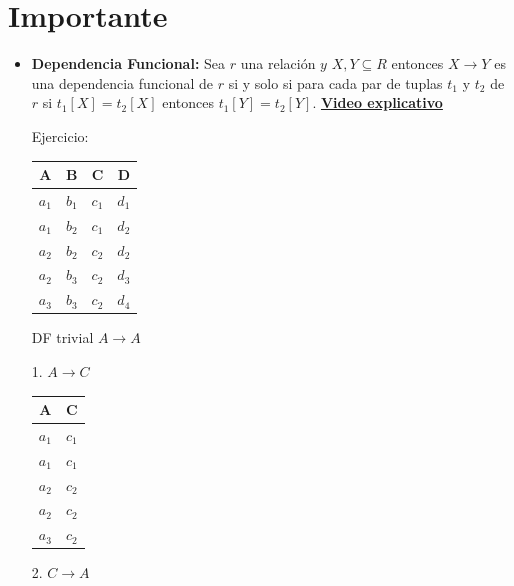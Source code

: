 \documentclass{templateNote}
\begin{document}
\portada
\margenes %

\section{Importante}

\begin{itemize}
    \item \textbf{Dependencia Funcional:} Sea $r$ una relación $y$ $X,Y \subseteq R$ entonces $X \rightarrow Y$ es una dependencia funcional de $r$ si y solo si para cada par de tuplas $t_1$ y $t_2$ de $r$ si $t_1[X] = t_2[X]$ entonces $t_1[Y] = t_2[Y]$.  
    \textbf{\href{https://www.youtube.com/watch?v=1PJLDStZVlo}{Video explicativo}}

    Ejercicio:
    \begin{center}
        \begin{tabular}{|c|c|c|c|}
            \hline
            \textbf{A} & \textbf{B} & \textbf{C} & \textbf{D} \\ \hline
            $a_1$ & $b_1$ & $c_1$ & $d_1$ \\ \hline
            $a_1$ & $b_2$ & $c_1$ & $d_2$ \\ \hline
            $a_2$ & $b_2$ & $c_2$ & $d_2$ \\ \hline
            $a_2$ & $b_3$ & $c_2$ & $d_3$ \\ \hline
            $a_3$ & $b_3$ & $c_2$ & $d_4$ \\ \hline
        \end{tabular}
    \end{center}

    DF trivial $ A \rightarrow A$
    \begin{center}
        
        \begin{minipage}{0.3\textwidth}
            1. $A \rightarrow C$
            \\

            \centering
            \begin{tabular}{|c|c|}
                \hline
                \textbf{A} & \textbf{C} \\ \hline
                $a_1$ & $c_1$ \\ \hline
                $a_1$ & $c_1$ \\ \hline
                $a_2$ & $c_2$ \\ \hline
                $a_2$ & $c_2$ \\ \hline
                $a_3$ & $c_2$ \\ \hline
            \end{tabular}
        \end{minipage}
        \begin{minipage}{0.3\textwidth}
            2. $C \rightarrow A$
            \\


\end{minipage}
\end{center}
\end{itemize}
\end{document}
